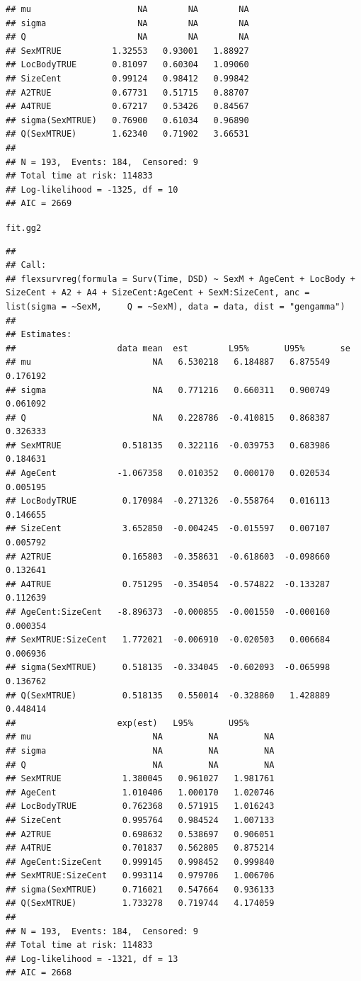 \documentclass{article}\usepackage[]{graphicx}\usepackage[]{color}
\makeatletter
\newcommand{\hlstd}[1]{\textcolor[rgb]{0.345,0.345,0.345}{#1}}%
\newenvironment{kframe}{%
 \def\at@end@of@kframe{}%
 \ifinner\ifhmode%
  \def\at@end@of@kframe{\end{minipage}}%
  \begin{minipage}{\columnwidth}%
 \fi\fi%
 \def\FrameCommand##1{\hskip\@totalleftmargin \hskip-\fboxsep
 \colorbox{shadecolor}{##1}\hskip-\fboxsep
     \hskip-\linewidth \hskip-\@totalleftmargin \hskip\columnwidth}%
 \MakeFramed {\advance\hsize-\width
   \@totalleftmargin\z@ \linewidth\hsize
   \@setminipage}}%
 {\par\unskip\endMakeFramed%
 \at@end@of@kframe}
\newenvironment{knitrout}{}{} %
\makeatother
\begin{document}
\begin{knitrout}
\begin{kframe}
\begin{verbatim}
## mu                     NA        NA        NA
## sigma                  NA        NA        NA
## Q                      NA        NA        NA
## SexMTRUE          1.32553   0.93001   1.88927
## LocBodyTRUE       0.81097   0.60304   1.09060
## SizeCent          0.99124   0.98412   0.99842
## A2TRUE            0.67731   0.51715   0.88707
## A4TRUE            0.67217   0.53426   0.84567
## sigma(SexMTRUE)   0.76900   0.61034   0.96890
## Q(SexMTRUE)       1.62340   0.71902   3.66531
## 
## N = 193,  Events: 184,  Censored: 9
## Total time at risk: 114833
## Log-likelihood = -1325, df = 10
## AIC = 2669
\end{verbatim}
\begin{alltt}
\hlstd{fit.gg2}
\end{alltt}
\begin{verbatim}
## 
## Call:
## flexsurvreg(formula = Surv(Time, DSD) ~ SexM + AgeCent + LocBody +     SizeCent + A2 + A4 + SizeCent:AgeCent + SexM:SizeCent, anc = list(sigma = ~SexM,     Q = ~SexM), data = data, dist = "gengamma")
## 
## Estimates: 
##                    data mean  est        L95%       U95%       se       
## mu                        NA   6.530218   6.184887   6.875549   0.176192
## sigma                     NA   0.771216   0.660311   0.900749   0.061092
## Q                         NA   0.228786  -0.410815   0.868387   0.326333
## SexMTRUE            0.518135   0.322116  -0.039753   0.683986   0.184631
## AgeCent            -1.067358   0.010352   0.000170   0.020534   0.005195
## LocBodyTRUE         0.170984  -0.271326  -0.558764   0.016113   0.146655
## SizeCent            3.652850  -0.004245  -0.015597   0.007107   0.005792
## A2TRUE              0.165803  -0.358631  -0.618603  -0.098660   0.132641
## A4TRUE              0.751295  -0.354054  -0.574822  -0.133287   0.112639
## AgeCent:SizeCent   -8.896373  -0.000855  -0.001550  -0.000160   0.000354
## SexMTRUE:SizeCent   1.772021  -0.006910  -0.020503   0.006684   0.006936
## sigma(SexMTRUE)     0.518135  -0.334045  -0.602093  -0.065998   0.136762
## Q(SexMTRUE)         0.518135   0.550014  -0.328860   1.428889   0.448414
##                    exp(est)   L95%       U95%     
## mu                        NA         NA         NA
## sigma                     NA         NA         NA
## Q                         NA         NA         NA
## SexMTRUE            1.380045   0.961027   1.981761
## AgeCent             1.010406   1.000170   1.020746
## LocBodyTRUE         0.762368   0.571915   1.016243
## SizeCent            0.995764   0.984524   1.007133
## A2TRUE              0.698632   0.538697   0.906051
## A4TRUE              0.701837   0.562805   0.875214
## AgeCent:SizeCent    0.999145   0.998452   0.999840
## SexMTRUE:SizeCent   0.993114   0.979706   1.006706
## sigma(SexMTRUE)     0.716021   0.547664   0.936133
## Q(SexMTRUE)         1.733278   0.719744   4.174059
## 
## N = 193,  Events: 184,  Censored: 9
## Total time at risk: 114833
## Log-likelihood = -1321, df = 13
## AIC = 2668
\end{verbatim}
\end{kframe}
\end{knitrout}
\end{document}

